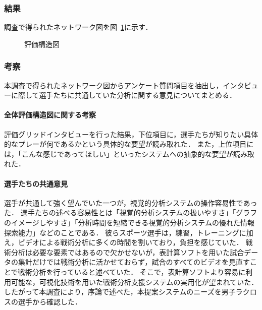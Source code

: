 \documentclass[sotsuron]{kuee}
\begin{document}
			\subsubsection{結果}	
				調査で得られたネットワーク図を図~\ref{fig:egrid}に示す．
					\begin{figure}
						\begin{center}
						\end{center}
						\caption{評価構造図}
				  		\label{fig:egrid}
					\end{figure}
			\subsubsection{考察}
				本調査で得られたネットワーク図からアンケート質問項目を抽出し，インタビューに際して選手たちに共通していた分析に関する意見についてまとめる．
				\paragraph{全体評価構造図に関する考察}
					評価グリッドインタビューを行った結果，下位項目に，選手たちが知りたい具体的なプレーが何であるかという具体的な要望が読み取れた．
					また，上位項目には，「こんな感じであってほしい」といったシステムへの抽象的な要望が読み取れた．
				\paragraph{選手たちの共通意見}
					選手が共通して強く望んでいた一つが，視覚的分析システムの操作容易性であった．
					選手たちの述べる容易性とは「視覚的分析システムの扱いやすさ」「グラフのイメージしやすさ」「分析時間を短縮できる視覚的分析システムの優れた情報探索能力」などのことである．
					彼らスポーツ選手は，練習，トレーニングに加え，ビデオによる戦術分析に多くの時間を割いており，負担を感じていた．
					戦術分析は必要な要素ではあるので欠かせないが，表計算ソフトを用いた試合データの集計だけでは戦術分析に活かせておらず，試合のすべてのビデオを見直すことで戦術分析を行っていると述べていた．
					そこで，表計算ソフトより容易に利用可能な，可視化技術を用いた戦術分析支援システムの実用化が望まれていた．
					したがって本調査により，序論で述べた，本提案システムのニーズを男子ラクロスの選手から確認した．
\end{document}
